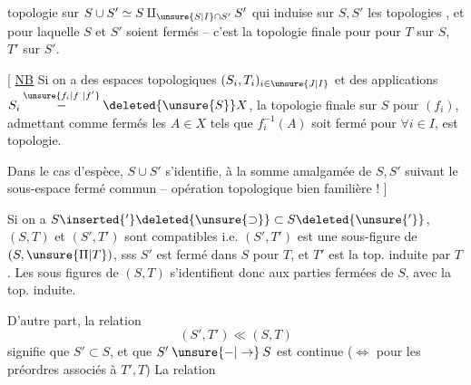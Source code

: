 topologie sur $S\cup S'\simeq S\amalg_{\unsure{S|I}\cap S'}S'$ qui  induise sur $S,S'$ les topologies , et pour laquelle $S$ et $S'$ soient fermés -- c'est la topologie finale pour
pour $T$ sur $S$, $T'$ sur $S'$.

[ \uline{NB} Si on a des espaces topologiques $(S_i,T_i)_{i\in\unsure{J|I}}$ et des applications $S_i\overset{\unsure{f_i|f^{\cdot}|f'}}{\mathbin{-}}\deleted{\unsure{S}}X$, la topologie finale sur $S$ pour $(f_i)$, admettant comme fermés les $A\in X$ tels que $f_i^{-1}(A)$ soit fermé pour $\forall i\in I$, est  topologie.


Dans le cas d'espèce, $S\cup S'$ s'identifie, à la somme amalgamée de $S,S'$ suivant le sous-espace fermé commun -- opération topologique bien familière ! ]

Si on a $S\inserted{'}\deleted{\unsure{\supset}}\subset S\deleted{\unsure{'}}$, $(S,T)$ et $(S',T')$ sont compatibles i.e. $(S',T')$ est une sous-figure de $(S,\unsure{\Pi|T})$, sss $S'$ est fermé dans $S$ pour $T$, et $T'$ est la top. induite par $T$. Les sous figures de $(S,T)$ s'identifient donc aux parties fermées de $S$, avec la top. induite.

D'autre part, la relation
\[
 (S',T')\ll(S,T)
\]
signifie que $S'\subset S$, et que $S'\mathbin{\unsure{-|\to}}S$ est continue ($\Longleftrightarrow$  pour les préordres associés à $T',T$) La relation
